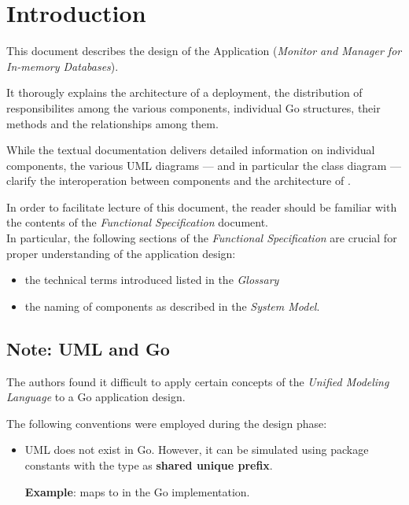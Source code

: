 \section{Introduction}

This document describes the design of the Application \mamid (\emph{Monitor and Manager for In-memory Databases}).

It thorougly explains the architecture of a \mamid deployment, the distribution of responsibilites among the various components,
individual Go structures, their methods and the relationships among them.

While the textual documentation delivers detailed information on individual components, the various UML diagrams
--- and in particular the class diagram --- clarify the interoperation between components and the architecture of \mamid.

In order to facilitate lecture of this document, the reader should be familiar with the contents of the \emph{Functional Specification}
document.\\
In particular, the following sections of the \emph{Functional Specification} are crucial for proper understanding of the
application design:
\begin{itemize}
  \item the technical terms introduced listed in the \emph{Glossary}
  \item the naming of \mamid components as described in the \emph{System Model}.
\end{itemize}

\subsection{Note: UML and Go}

The authors found it difficult to apply certain concepts of the \emph{Unified Modeling Language} to a Go application design.

The following conventions were employed during the design phase:

\begin{itemize}
        \item UML  does not exist in Go. However, it can be simulated using package constants with the  type as \textbf{shared unique prefix}. 

                \textbf{Example}:  maps to  in the Go implementation.
\end{itemize}

